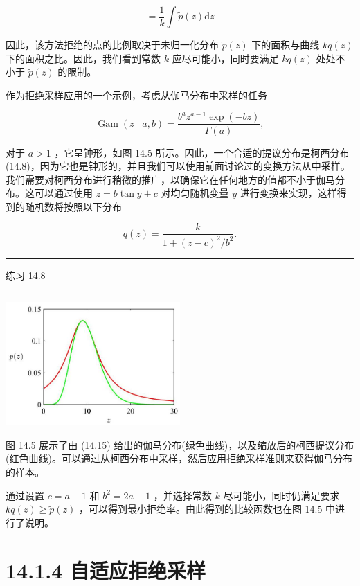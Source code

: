 \documentclass[10pt]{report}
\newcommand{\HRule}{\begin{center}\rule{0.9\linewidth}{0.2mm}\end{center}}
\begin{document}
\[
= \frac{1}{k}\int \widetilde{p}\left( z\right) \mathrm{d}z \tag{14.14}
\]

因此，该方法拒绝的点的比例取决于未归一化分布 \(\widetilde{p}\left( z\right)\) 下的面积与曲线 \({kq}\left( z\right)\) 下的面积之比。因此，我们看到常数 \(k\) 应尽可能小，同时要满足 \({kq}\left( z\right)\) 处处不小于 \(\widetilde{p}\left( z\right)\) 的限制。

作为拒绝采样应用的一个示例，考虑从伽马分布中采样的任务

\[
\operatorname{Gam}\left( {z \mid  a,b}\right)  = \frac{{b}^{a}{z}^{a - 1}\exp \left( {-{bz}}\right) }{\Gamma \left( a\right) }, \tag{14.15}
\]

对于 \(a > 1\) ，它呈钟形，如图 14.5 所示。因此，一个合适的提议分布是柯西分布 (14.8)，因为它也是钟形的，并且我们可以使用前面讨论过的变换方法从中采样。我们需要对柯西分布进行稍微的推广，以确保它在任何地方的值都不小于伽马分布。这可以通过使用 \(z = b\tan y + c\) 对均匀随机变量 \(y\) 进行变换来实现，这样得到的随机数将按照以下分布

\[
q\left( z\right)  = \frac{k}{1 + {\left( z - c\right) }^{2}/{b}^{2}}. \tag{14.16}
\]

\HRule

练习 14.8

\HRule

\begin{center}
\includegraphics[max width=0.5\textwidth]{images/0194e279-9b28-703a-88f4-c3ac21e2010d_454_902_358_635_448_0.jpg}
\end{center}
\hspace*{3em} 

图 14.5 展示了由 (14.15) 给出的伽马分布(绿色曲线)，以及缩放后的柯西提议分布(红色曲线)。可以通过从柯西分布中采样，然后应用拒绝采样准则来获得伽马分布的样本。

通过设置 \(c = a - 1\) 和 \({b}^{2} = {2a} - 1\) ，并选择常数 \(k\) 尽可能小，同时仍满足要求 \({kq}\left( z\right)  \geq  \widetilde{p}\left( z\right)\) ，可以得到最小拒绝率。由此得到的比较函数也在图 14.5 中进行了说明。

\section*{14.1.4 自适应拒绝采样}
\end{document}

